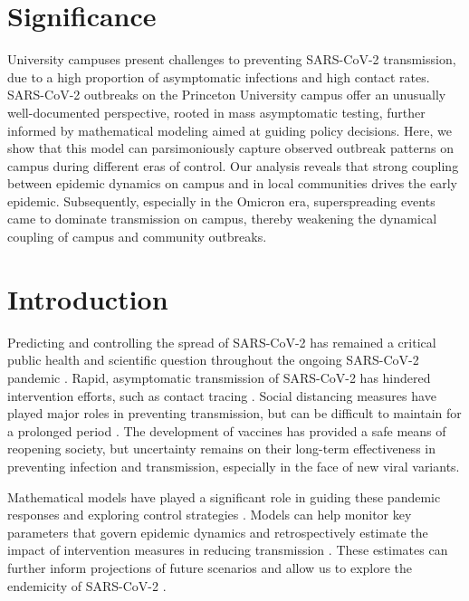 \documentclass[12pt]{article}
\begin{document}
\section*{Significance}

University campuses present challenges to preventing SARS-CoV-2 transmission, due to a high proportion of asymptomatic infections and high contact rates. SARS-CoV-2 outbreaks on the Princeton University campus offer an unusually well-documented perspective, rooted in mass asymptomatic testing, further informed by mathematical modeling aimed at guiding policy decisions. Here, we show that this model can parsimoniously capture observed outbreak patterns on campus during different eras of control. Our analysis reveals that strong coupling between epidemic dynamics on campus and in local communities drives the early epidemic. Subsequently, especially in the Omicron era, superspreading events came to dominate transmission on campus, thereby weakening the dynamical coupling of campus and community outbreaks.

\pagebreak

\section*{Introduction}

Predicting and controlling the spread of SARS-CoV-2 has remained a critical public health and scientific question throughout the ongoing SARS-CoV-2 pandemic \citep{baker2021limits}.
Rapid, asymptomatic transmission of SARS-CoV-2 has hindered intervention efforts, such as contact tracing \citep{hellewell2020feasibility}.
Social distancing measures have played major roles in preventing transmission, but can be difficult to maintain for a prolonged period \citep{galanti2021social}.
The development of vaccines has provided a safe means of reopening society, but uncertainty remains on their long-term effectiveness in preventing infection and transmission, especially in the face of new viral variants.

Mathematical models have played a significant role in guiding these pandemic responses and exploring control strategies \citep{cobey2020modeling,holmdahl2020wrong,metcalf2020mathematical,koelle2022changing}.
Models can help monitor key parameters that govern epidemic dynamics \citep{kraemer2021monitoring} and retrospectively estimate the impact of intervention measures in reducing transmission \citep{flaxman2020estimating}.
These estimates can further inform projections of future scenarios and allow us to explore the endemicity of SARS-CoV-2 \citep{kissler2020projecting,saad2020immune,lavine2021immunological,saad2021epidemiological}.
\end{document}
